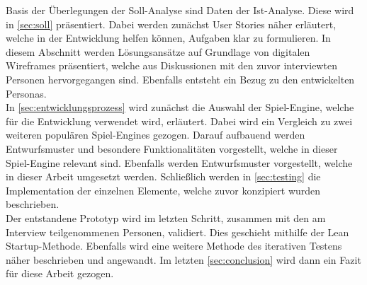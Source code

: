 Basis der Überlegungen der Soll-Analyse sind Daten der Ist-Analyse. Diese wird in \autoref{sec:soll} präsentiert. Dabei werden zunächst User Stories näher erläutert, welche in der Entwicklung helfen können, Aufgaben klar zu formulieren. In diesem Abschnitt werden Lösungsansätze auf Grundlage von digitalen Wireframes präsentiert, welche aus Diskussionen mit den zuvor interviewten Personen hervorgegangen sind. Ebenfalls entsteht ein Bezug zu den entwickelten Personas. \\

In \autoref{sec:entwicklungsprozess} wird zunächst die Auswahl der Spiel-Engine, welche für die Entwicklung verwendet wird, erläutert. Dabei wird ein Vergleich zu zwei weiteren populären Spiel-Engines gezogen. Darauf aufbauend werden Entwurfsmuster und besondere Funktionalitäten vorgestellt, welche in dieser Spiel-Engine relevant sind. Ebenfalls werden Entwurfsmuster vorgestellt, welche in dieser Arbeit umgesetzt werden. Schließlich werden in \autoref{sec:testing} die Implementation der einzelnen Elemente, welche zuvor konzipiert wurden beschrieben. \\

Der entstandene Prototyp wird im letzten Schritt, zusammen mit den am Interview teilgenommenen Personen, validiert. Dies geschieht mithilfe der Lean Startup-Methode. Ebenfalls wird eine weitere Methode des iterativen Testens näher beschrieben und angewandt. Im letzten \autoref{sec:conclusion} wird dann ein Fazit für diese Arbeit gezogen.
